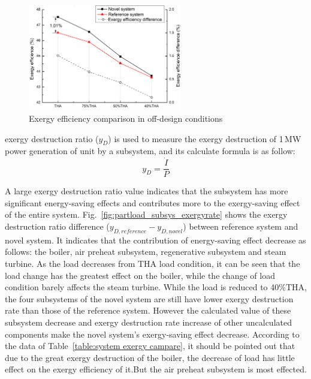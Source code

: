 \documentclass[preprint,12pt]{elsarticle}
\begin{document}
\begin{figure}[htbp]
\centering
\includegraphics[width=0.6\textwidth]{fig/partload_efficiency.png}
\caption{Exergy efficiency comparison in off-design conditions} 
\label{fig:partload_efficiency}
\end{figure}
  exergy destruction ratio ($y_{D}$) is used to measure the exergy destruction of 1\,MW power generation of unit by a subsystem, and its calculate formula is as follow:
\begin{equation}
y_{D}=\frac{\dot{I}}{P}
\end{equation}

A large exergy destruction ratio value indicates that the subsystem has more significant energy-saving effects and contributes more to the exergy-saving effect of the entire system.
Fig.~\ref{fig:partload_subsys_exergyrate} shows the  exergy destruction ratio difference ($y_{D,reference}-y_{D,novel}$) between reference system and novel system.
It indicates that the contribution of energy-saving effect decrease as follows: the boiler, air preheat subsystem, regenerative subsystem and steam turbine.
As the load decreases from THA load condition, it can be seen that the load change has the greatest effect on the boiler, while the change of load condition barely affects the steam turbine.
While the load is reduced to 40\%THA, the four subsystems of the novel system are still have lower exergy destruction rate than those of the reference system.
However the calculated value of these subsystem decrease and exergy destruction rate increase of other uncalculated components make the novel system's exergy-saving effect decrease.
According to the data of Table~\ref{table:system exergy campare}, it should be pointed out that due to the great exergy destruction of the boiler, the decrease of load has little effect on the exergy efficiency of it.But the air preheat subsystem is most effected.
\end{document}
